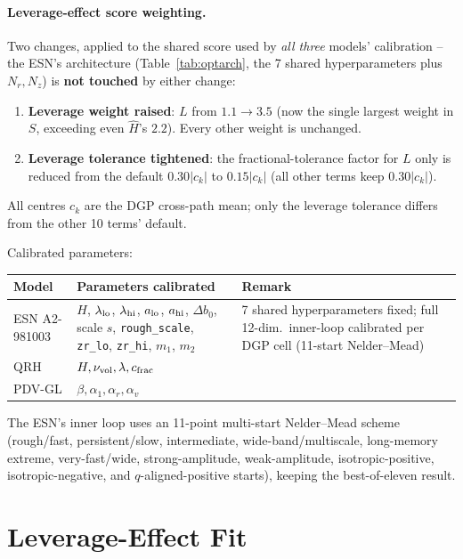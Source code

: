 \documentclass[11pt,a4paper]{article}
\begin{document}
\paragraph{Leverage-effect score weighting.} Two changes, applied to
the shared score used by \emph{all three} models' calibration -- the
ESN's architecture (Table~\ref{tab:optarch}, the 7 shared
hyperparameters plus $N_r,N_z$) is \textbf{not touched} by either
change:
\begin{enumerate}[itemsep=2pt]
  \item \textbf{Leverage weight raised}: $L$ from $1.1\to3.5$ (now the
    single largest weight in $S$, exceeding even $\hat H$'s $2.2$).
    Every other weight is unchanged.
  \item \textbf{Leverage tolerance tightened}: the fractional-tolerance
    factor for $L$ only is reduced from the default $0.30|c_k|$
    to $0.15|c_k|$ (all other terms keep $0.30|c_k|$).
\end{enumerate}
All centres $c_k$ are the DGP cross-path mean; only the leverage
tolerance differs from the other 10 terms' default.

Calibrated parameters:
\begin{center}\renewcommand{\arraystretch}{1.3}
\begin{tabular}{@{}p{3.0cm}p{6.4cm}p{5.0cm}@{}}\toprule
Model & Parameters calibrated & Remark \\\midrule
ESN A2-981003 & $H$, $\lambda_{\rm lo}$, $\lambda_{\rm hi}$, $a_{\rm lo}$,
  $a_{\rm hi}$, $\Delta b_0$, scale $s$, \texttt{rough\_scale},
  \texttt{zr\_lo}, \texttt{zr\_hi}, $m_1$, $m_2$ &
  7 shared hyperparameters fixed; full 12-dim.\ inner-loop calibrated
  per DGP cell (11-start Nelder--Mead) \\
QRH & $H,\nu_{\rm vol},\lambda,c_{\rm frac}$ & \\
PDV-GL & $\beta,\alpha_1,\alpha_r,\alpha_v$ & \\
\bottomrule\end{tabular}\end{center}
The ESN's inner loop uses an 11-point multi-start Nelder--Mead scheme
(rough/fast, persistent/slow, intermediate, wide-band/multiscale,
long-memory extreme, very-fast/wide, strong-amplitude, weak-amplitude,
isotropic-positive, isotropic-negative, and $q$-aligned-positive
starts), keeping the best-of-eleven result.

\section{Leverage-Effect Fit}
\label{sec:leverage-results}
\end{document}
